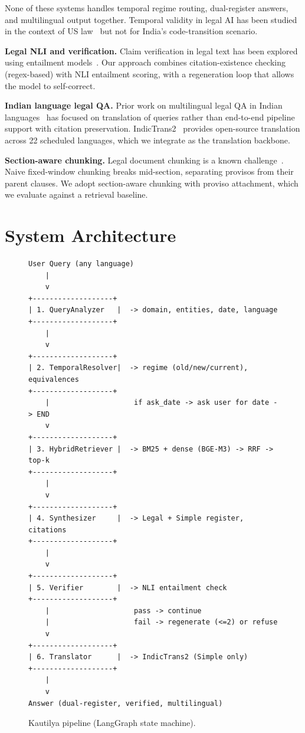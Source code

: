 \documentclass[conference]{IEEEtran}
\begin{document}
None of these systems handles temporal regime routing, dual-register answers, and multilingual output together. Temporal validity in legal AI has been studied in the context of US law~\cite{temporal-legal-us} but not for India's code-transition scenario.

\textbf{Legal NLI and verification.} Claim verification in legal text has been explored using entailment models~\cite{legal-nli}. Our approach combines citation-existence checking (regex-based) with NLI entailment scoring, with a regeneration loop that allows the model to self-correct.

\textbf{Indian language legal QA.} Prior work on multilingual legal QA in Indian languages~\cite{indic-legal} has focused on translation of queries rather than end-to-end pipeline support with citation preservation. IndicTrans2~\cite{indictrans2} provides open-source translation across 22 scheduled languages, which we integrate as the translation backbone.

\textbf{Section-aware chunking.} Legal document chunking is a known challenge~\cite{legal-chunking-survey}. Naive fixed-window chunking breaks mid-section, separating provisos from their parent clauses. We adopt section-aware chunking with proviso attachment, which we evaluate against a retrieval baseline.

\section{System Architecture}
\label{sec:architecture}

\begin{figure}[t]
\centering
\begin{verbatim}
User Query (any language)
    |
    v
+-------------------+
| 1. QueryAnalyzer   |  -> domain, entities, date, language
+-------------------+
    |
    v
+-------------------+
| 2. TemporalResolver|  -> regime (old/new/current), equivalences
+-------------------+
    |                    if ask_date -> ask user for date -> END
    v
+-------------------+
| 3. HybridRetriever |  -> BM25 + dense (BGE-M3) -> RRF -> top-k
+-------------------+
    |
    v
+-------------------+
| 4. Synthesizer     |  -> Legal + Simple register, citations
+-------------------+
    |
    v
+-------------------+
| 5. Verifier        |  -> NLI entailment check
+-------------------+
    |                    pass -> continue
    |                    fail -> regenerate (<=2) or refuse
    v
+-------------------+
| 6. Translator      |  -> IndicTrans2 (Simple only)
+-------------------+
    |
    v
Answer (dual-register, verified, multilingual)
\end{verbatim}
\caption{Kautilya pipeline (LangGraph state machine).}
\label{fig:pipeline}
\end{figure}
\end{document}
